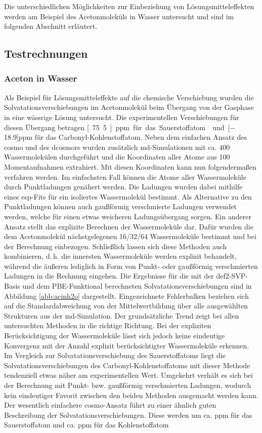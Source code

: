 Die unterschiedlichen Möglichkeiten zur Einbeziehung von Lösungsmitteleffekten werden am Beispiel des Acetonmoleküls in Wasser untersucht und sind im folgenden Abschnitt erläutert.
	
	\subsection{Testrechnungen}\label{lömitest}
	\subsubsection{Aceton in Wasser}
	Als Beispiel für Lösungsmitteleffekte auf die chemische Verschiebung wurden die Solvatationsverschiebungen im Acetonmolekül beim Übergang von der Gasphase in eine wässrige Lösung untersucht. Die experimentellen Verschiebungen für diesen Übergang betragen \unit[75.5]{ppm} für das Sauerstoffatom\supercite{cossi2003different} und \unit[$-$18.9]{ppm} für das Carbonyl-Kohlenstoffatom\supercite{tiffon1978effet}. Neben dem einfachen Ansatz des \ac{cosmo} und des \ac{dcosmors} wurden zusätzlich \ac{md}-Simulationen mit ca. 400 Wassermolekülen durchgeführt und die Koordinaten aller Atome aus 100 Momentaufnahmen extrahiert. Mit diesen Koordinaten kann nun folgendermaßen verfahren werden. Im einfachsten Fall können die Atome aller Wassermoleküle durch Punktladungen genähert werden. Die Ladungen wurden dabei mithilfe eines \acs{esp}-Fits für ein isoliertes Wassermolekül bestimmt. Als Alternative zu den Punktladungen können auch gaußförmig verschmierte Ladungen verwendet werden, welche für einen etwas weicheren Ladungsübergang sorgen. Ein anderer Ansatz stellt das explizite Berechnen der Wassermoleküle dar. Dafür wurden die dem Acetonmolekül nächstgelegenen 16/32/64 Wassermoleküle bestimmt und bei der Berechnung einbezogen. Schließlich lassen sich diese Methoden auch kombinieren, d.\,h. die innersten Wassermoleküle werden explizit behandelt, während die äußeren lediglich in Form von Punkt- oder gaußförmig verschmierten Ladungen in die Rechnung eingehen. Die Ergebnisse für die mit der def2-SVP-Basis\supercite{weigend2005balanced} und dem PBE-Funktional\supercite{perdew1996generalized} berechneten Solvatationsverschiebungen sind in Abbildung \ref{abb:acinh2o} dargestellt. Eingezeichnete Fehlerbalken beziehen sich auf die Standardabweichung von der Mittelwertbildung über alle ausgewählten Strukturen aus der \ac{md}-Simulation. Der grundsätzliche Trend zeigt bei allen untersuchten Methoden in die richtige Richtung. Bei der expliziten Berücksichtigung der Wassermoleküle lässt sich jedoch keine eindeutige Konvergenz mit der Anzahl explizit berücksichtigter Wassermoleküle erkennen. Im Vergleich zur Solvatationsverschiebung des Sauerstoffatoms liegt die Solvatationsverschiebungen des Carbonyl-Kohlenstoffatoms mit dieser Methode tendenziell etwas näher am experimentellen Wert. Umgekehrt verhält es sich bei der Berechnung mit Punkt- bzw. gaußförmig verschmierten Ladungen, wodurch kein eindeutiger Favorit zwischen den beiden Methoden ausgemacht werden kann. Der wesentlich einfachere \ac{cosmo}-Ansatz führt zu einer ähnlich guten Beschreibung der Solvatationsverschiebungen. Diese werden um ca. \unit[25]{ppm} für das Sauerstoffatom und ca. \unit[9]{ppm} für das Kohlenstoffatom 